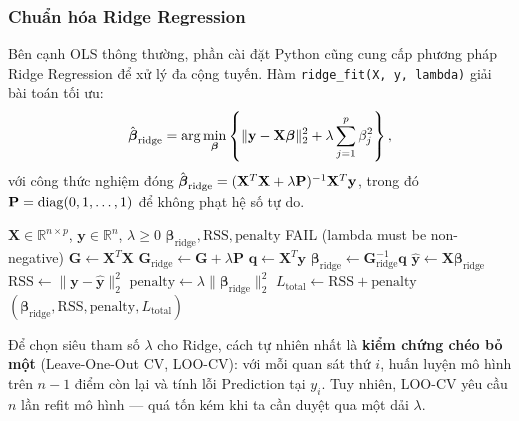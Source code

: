\subsubsection{Chuẩn hóa Ridge Regression}

Bên cạnh OLS thông thường, phần cài đặt Python cũng cung cấp phương pháp Ridge Regression để xử lý đa cộng tuyến. Hàm \texttt{ridge\_fit(X, y, lambda)} giải bài toán tối ưu:
\[
    \hat{\boldsymbol{\beta}}_{\mathrm{ridge}} = \arg\min_{\boldsymbol{\beta}} \left\{ \|\mathbf{y} - \mathbf{X}\boldsymbol{\beta}\|_2^2 + \lambda \sum_{j=1}^{p}\beta_j^2 \right\},
\]
với công thức nghiệm đóng
$\hat{\boldsymbol{\beta}}_{\mathrm{ridge}} =
(\mathbf{X}^T\mathbf{X} + \lambda\mathbf{P})^{-1}\mathbf{X}^T\mathbf{y}$,
trong đó $\mathbf{P}=\operatorname{diag}(0,1,\ldots,1)$ để không phạt hệ số tự do.

\begin{algorithm}[H]
\caption{Ridge Regression}
\begin{algorithmic}[1]
\Require $\mathbf{X} \in \mathbb{R}^{n \times p}$, $\mathbf{y} \in \mathbb{R}^n$, $\lambda \geq 0$
\Ensure $\boldsymbol{\beta}_{\text{ridge}}, \text{RSS}, \text{penalty}$
    \State \Return \textsc{FAIL} (lambda must be non-negative)
\EndIf
\State $\mathbf{G} \gets \mathbf{X}^T\mathbf{X}$
\State $\mathbf{G}_{\text{ridge}} \gets \mathbf{G} + \lambda \mathbf{P}$ 
\State $\mathbf{q} \gets \mathbf{X}^T\mathbf{y}$
\State $\boldsymbol{\beta}_{\text{ridge}} \gets \mathbf{G}_{\text{ridge}}^{-1} \mathbf{q}$
\State $\hat{\mathbf{y}} \gets \mathbf{X} \boldsymbol{\beta}_{\text{ridge}}$
\State $\text{RSS} \gets \|\mathbf{y} - \hat{\mathbf{y}}\|_2^2$
\State $\text{penalty} \gets \lambda \|\boldsymbol{\beta}_{\text{ridge}}\|_2^2$ 
\State $L_{\text{total}} \gets \text{RSS} + \text{penalty}$
\State \Return $(\boldsymbol{\beta}_{\text{ridge}}, \text{RSS}, \text{penalty}, L_{\text{total}})$
\end{algorithmic}
\end{algorithm}


Để chọn siêu tham số $\lambda$ cho Ridge, cách tự nhiên nhất là \textbf{kiểm chứng
chéo bỏ một} (Leave-One-Out CV, LOO-CV): với mỗi quan sát thứ $i$, huấn luyện mô
hình trên $n-1$ điểm còn lại và tính lỗi Prediction tại $y_i$. Tuy nhiên, LOO-CV
yêu cầu $n$ lần refit mô hình --- quá tốn kém khi ta cần duyệt qua một dải $\lambda$.


